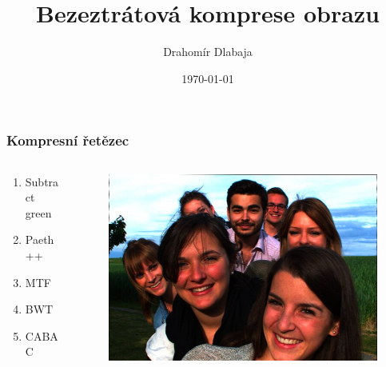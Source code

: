\documentclass{beamer}
\title{Bezeztrátová komprese obrazu}
\author{Drahomír Dlabaja}
\institute[xdlaba02]{Vysoké učení technické v Brně}
\date{\today}
\begin{document}
\begin{frame}
  \titlepage
\end{frame}

\begin{frame}
  \center
  \frametitle{Kompresní řetězec}
  \begin{columns}
    \begin{column}{0.4\textwidth}
      \LARGE
  \begin{enumerate}
  \item Subtract green
  \item Paeth++
  \item MTF
  \item BWT
  \item CABAC
  \end{enumerate}
  \end{column}
  \begin{column}{0.6\textwidth}
    \begin{figure}
      \includegraphics[width=\textwidth]{friends.jpg}
    \end{figure}
\end{column}
\end{columns}
\end{frame}
\end{document}
